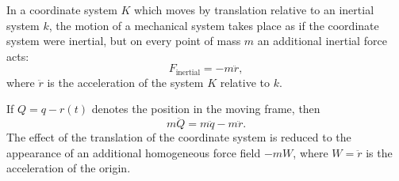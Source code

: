 In a coordinate system $K$ which moves by translation relative to an inertial system $k$, the motion of a mechanical system takes place as if the coordinate system were inertial, but on every point of mass $m$ an additional inertial force acts:
$$
F_{\text{inertial}} = -m\ddot{r},
$$
where $\ddot{r}$ is the acceleration of the system $K$ relative to $k$.

If $Q = q - r(t)$ denotes the position in the moving frame, then
$$
m\ddot{Q} = m\ddot{q} - m\ddot{r}.
$$
The effect of the translation of the coordinate system is reduced to the appearance of an additional homogeneous force field $-mW$, where $W = \ddot{r}$ is the acceleration of the origin.
